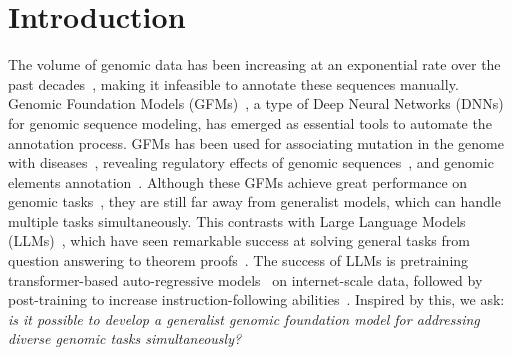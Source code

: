 \section{Introduction}




The volume of genomic data has been increasing at an exponential rate over the past decades~\cite{lathe2008genomic}, making it infeasible to annotate these sequences manually. 
Genomic Foundation Models (GFMs)~\cite{nguyen2024hyenadna,zhou2023dnabert,dalla2024nucleotide,schiff2024caduceus}, a type of Deep Neural Networks (DNNs) for genomic sequence modeling, has emerged as essential tools to automate the annotation process. GFMs has been used for associating mutation in the genome with diseases~\cite{benegas2023dna,cheng2023accurate}, revealing regulatory effects of genomic sequences~\cite{avsec2021effective,linder2025predicting}, and genomic elements annotation~\cite{de2024segmentnt}. Although these GFMs achieve great performance on genomic tasks~\citep{zhou2015predicting,grevsova2023genomic}, they are still far away from generalist models, which can handle multiple tasks simultaneously. This contrasts with Large Language Models (LLMs)~\citep{radford2019language,team2023gemini,touvron2023llama}, which have seen remarkable success at solving general tasks from question answering to theorem proofs~\cite{xin2024deepseek}. The success of LLMs is pretraining transformer-based auto-regressive models~\cite{vaswani2017attention} on internet-scale data, followed by post-training to increase instruction-following abilities~\cite{lambert2024t}. Inspired by this, we ask: \textit{is it possible to develop a generalist genomic foundation model for addressing diverse genomic tasks simultaneously?}


